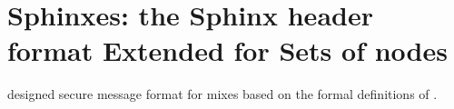 \section{Sphinxes: the Sphinx header format Extended for Sets of nodes}%
\label{Sphinxes}

\Textcite{Sphinx} designed  secure message format for mixes based on 
the formal definitions of \textcite{CLOnionRouting}.

